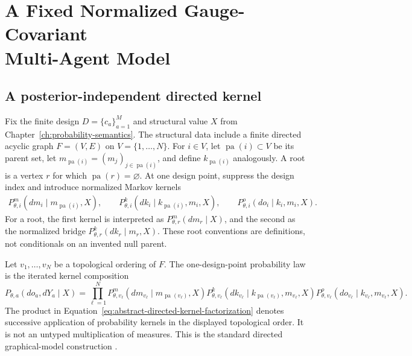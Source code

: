 \chapter[A Fixed Normalized Gauge-Covariant Multi-Agent Model]{A Fixed Normalized Gauge-Covariant\\Multi-Agent Model}
\label{ch:generative-model}

\section{A posterior-independent directed kernel}

Fix the finite design \(D=\{c_a\}_{a=1}^{M}\) and structural value \(X\) from Chapter~\ref{ch:probability-semantics}. The structural data include a finite directed acyclic graph \(F=(V,E)\) on \(V=\{1,\ldots,N\}\). For \(i\in V\), let \(\operatorname{pa}(i)\subset V\) be its parent set, let \(m_{\operatorname{pa}(i)}=(m_j)_{j\in\operatorname{pa}(i)}\), and define \(k_{\operatorname{pa}(i)}\) analogously. A root is a vertex \(r\) for which \(\operatorname{pa}(r)=\varnothing\). At one design point, suppress the design index and introduce normalized Markov kernels
\begin{align}
P_{\theta,i}^{m}(dm_i\mid m_{\operatorname{pa}(i)},X),
\qquad
P_{\theta,i}^{k}(dk_i\mid k_{\operatorname{pa}(i)},m_i,X),
\qquad
P_{\theta,i}^{o}(do_i\mid k_i,m_i,X).
\label{eq:abstract-directed-kernels}
\end{align}
For a root, the first kernel is interpreted as \(P_{\theta,r}^{m}(dm_r\mid X)\), and the second as the normalized bridge \(P_{\theta,r}^{k}(dk_r\mid m_r,X)\). These root conventions are definitions, not conditionals on an invented null parent.

Let \(v_1,\ldots,v_N\) be a topological ordering of \(F\). The one-design-point probability law is the iterated kernel composition
\begin{equation}
P_{\theta,a}(do_a,dY_a\mid X)
=\prod_{\ell=1}^{N}
P_{\theta,v_\ell}^{m}(dm_{v_\ell}\mid m_{\operatorname{pa}(v_\ell)},X)
P_{\theta,v_\ell}^{k}(dk_{v_\ell}\mid k_{\operatorname{pa}(v_\ell)},m_{v_\ell},X)
P_{\theta,v_\ell}^{o}(do_{v_\ell}\mid k_{v_\ell},m_{v_\ell},X).
\label{eq:abstract-directed-kernel-factorization}
\end{equation}
The product in Equation~\eqref{eq:abstract-directed-kernel-factorization} denotes successive application of probability kernels in the displayed topological order. It is not an untyped multiplication of measures. This is the standard directed graphical-model construction \citep{Lauritzen1996,Wainwright2008}.

